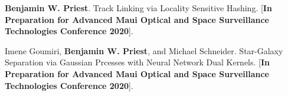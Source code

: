 \item \textbf{Benjamin W. Priest}.
	Track Linking via Locality Sensitive Hashing.
	[\textbf{In Preparation for Advanced Maui Optical and Space Surveillance Technologies Conference 2020}].

\item Imene Goumiri, \textbf{Benjamin W. Priest}, and Michael Schneider.
	Star-Galaxy Separation via Gaussian Prcesses with Neural Network Dual Kernels.
	[\textbf{In Preparation for Advanced Maui Optical and Space Surveillance Technologies Conference 2020}].
